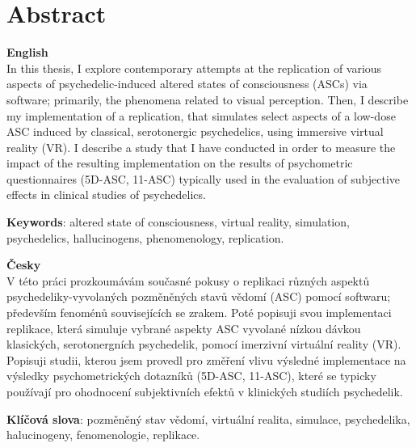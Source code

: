\chapter*{Abstract}

{\Large\textbf{English}}\\
In this thesis, I explore contemporary attempts at the replication of various aspects of psychedelic-induced altered states of consciousness (ASCs) via software; primarily, the phenomena related to visual perception. Then, I describe my implementation of a replication, that simulates select aspects of a low-dose ASC induced by classical, serotonergic psychedelics, using immersive virtual reality (VR). I describe a study that I have conducted in order to measure the impact of the resulting implementation on the results of psychometric questionnaires (5D-ASC, 11-ASC) typically used in the evaluation of subjective effects in clinical studies of psychedelics.

\textbf{Keywords}: altered state of consciousness, virtual reality, simulation, psychedelics, hallucinogens, phenomenology, replication.

\vspace{0.5cm}
\noindent
{\Large\textbf{Česky}}\\
V této práci prozkoumávám současné pokusy o replikaci různých aspektů psychedeliky-vyvolaných pozměněných stavů vědomí (ASC) pomocí softwaru; především fenoménů souvisejících se zrakem. Poté popisuji svou implementaci replikace, která simuluje vybrané aspekty ASC vyvolané nízkou dávkou klasických, serotonergních psychedelik, pomocí imerzivní virtuální reality (VR). Popisuji studii, kterou jsem provedl pro změření vlivu výsledné implementace na výsledky psychometrických dotazníků (5D-ASC, 11-ASC), které se typicky používají pro ohodnocení subjektivních efektů v klinických studiích psychedelik.

\textbf{Klíčová slova}: pozměněný stav vědomí, virtuální realita, simulace, psychedelika, halucinogeny, fenomenologie, replikace.
